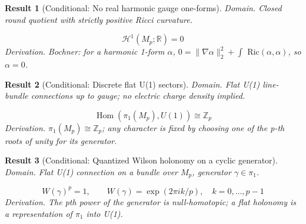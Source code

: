 \documentclass[aps,prd,onecolumn,notitlepage,groupedaddress,11pt]{revtex4-2}
\newtheorem{result}{Result}
\begin{document}
\begin{result}[\textsf{Conditional}: No real harmonic gauge one-forms]\label{bridge:26}
\textit{Domain.} Closed round quotient with strictly positive Ricci curvature.\par
\begin{equation}\label{bridgeeq:26}
\mathcal H^1(M_p;\mathbb R)=0
\end{equation}
\textit{Derivation.} Bochner: for a harmonic 1-form \(\alpha\), \(0=\|\nabla\alpha\|_2^2+\int\) \(\mathrm{Ric}(\alpha,\alpha)\), so \(\alpha=0\).
\end{result}
\begin{result}[\textsf{Conditional}: Discrete flat U(1) sectors]\label{bridge:27}
\textit{Domain.} Flat U(1) line-bundle connections up to gauge; no electric charge density implied.\par
\begin{equation}\label{bridgeeq:27}
\operatorname{Hom}(\pi_1(M_p),U(1))\cong\mathbb Z_p
\end{equation}
\textit{Derivation.} \(\pi_1(M_p)\cong\mathbb{Z}_p\); any character is fixed by choosing one of the p-th roots of unity for its generator.
\end{result}
\begin{result}[\textsf{Conditional}: Quantized Wilson holonomy on a cyclic generator]\label{bridge:28}
\textit{Domain.} Flat U(1) connection on a bundle over \(M_p\), generator \(\gamma\in\pi_1\).\par
\begin{equation}\label{bridgeeq:28}
W(\gamma)^p=1,\qquad W(\gamma)=\exp(2\pi i k/p),\quad k=0,\ldots,p-1
\end{equation}
\textit{Derivation.} The pth power of the generator is null-homotopic; a flat holonomy is a representation of \(\pi_1\) into U(1).
\end{result}
\end{document}
